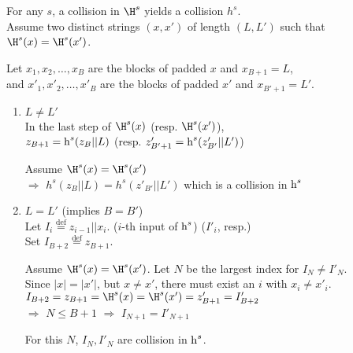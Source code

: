 \begin{myProof}
	For any \(s\), a collision in \(\H^s\) yields a collision \(h^s\). \\
	Assume two distinct strings \((x, x')\) of length \((L, L')\) such that \(\H^s(x) = \H^s(x')\).
	
	Let \(x_1, x_2, \ldots, x_B\) are the blocks of padded \(x\) and \(x_{B+1} = L\), \\
	and \(x'_1, x'_2, \ldots, x'_B\) are the blocks of padded \(x'\) and \(x_{B'+1} = L'\).
	
	\begin{enumerate}[label={Case \arabic*:}, leftmargin=50pt]
		\item \(L \neq L'\) \\
			In the last step of \(\H^s(x)\) (resp. \(\H^s(x')\)), \\
			\(z_{B+1} = \operatorname{\mathrm{h}}^s(z_B || L)\) (resp. \(z'_{B'+1} = \operatorname{\mathrm{h}}^s(z'_{B'} || L')\))
			
			Assume \(\H^s(x) = \H^s(x')\) \\
			\(\Rightarrow\) \quad \(h^s(z_B || L) = h^s(z'_{B'} || L')\)
			which is a collision in \(\operatorname{\mathrm{h}}^s\)
		
		\item \(L = L'\) (implies \(B = B'\)) \\
			Let \(I_i \overset{\mathrm{def}}{=} z_{i-1} || x_i\). (\(i\)-th input of \(\operatorname{\mathrm{h}}^s\)) (\(I'_i\), resp.) \\
			Set \(I_{B+2} \overset{\mathrm{def}}{=} z_{B+1}\).
			
			Assume \(\H^s(x) = \H^s(x')\). Let \(N\) be the largest index for \(I_N \neq I'_N\). \\
			Since \(|x| = |x'|\), but \(x \neq x'\), there must exist an \(i\) with \(x_i \neq x'_i\). \\
			\(I_{B+2} = z_{B+1} = \H^s(x) = \H^s(x') = z'_{B+1} = I'_{B+2}\) \\
			\(\Rightarrow\) \quad \(N \leq B+1\)
			\(\Rightarrow\) \quad \(I_{N+1} = I'_{N+1}\)
			
			For this \(N\), \(I_N, I'_N\) are collision in \(\operatorname{\mathrm{h}}^s\).
	\end{enumerate}
\end{myProof}
